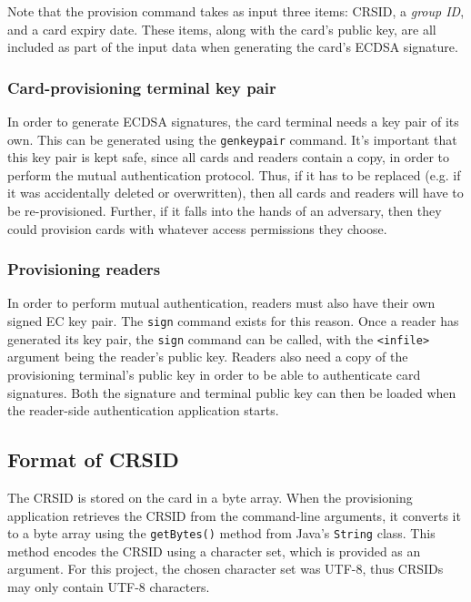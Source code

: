 \documentclass[12pt,a4paper,twoside,openright]{report}
\begin{document}
Note that the provision command takes as input three items: CRSID, a \emph{group ID}, and a card expiry date. These items, along with the card's public key, are all included as part of the input data when generating the card's ECDSA signature.

\subsubsection{Card-provisioning terminal key pair}

In order to generate ECDSA signatures, the card terminal needs a key pair of its own. This can be generated using the \texttt{genkeypair} command. It's important that this key pair is kept safe, since all cards and readers contain a copy, in order to perform the mutual authentication protocol. Thus, if it has to be replaced (e.g. if it was accidentally deleted or overwritten), then all cards and readers will have to be re-provisioned. Further, if it falls into the hands of an adversary, then they could provision cards with whatever access permissions they choose.

\subsubsection{Provisioning readers}

In order to perform mutual authentication, readers must also have their own signed EC key pair. The \texttt{sign} command exists for this reason. Once a reader has generated its key pair, the \texttt{sign} command can be called, with the \texttt{<infile>} argument being the reader's public key. Readers also need a copy of the provisioning terminal's public key in order to be able to authenticate card signatures. Both the signature and terminal public key can then be loaded when the reader-side authentication application starts.

\subsection{Format of CRSID}

The CRSID is stored on the card in a byte array. When the provisioning application retrieves the CRSID from the command-line arguments, it converts it to a byte array using the \texttt{getBytes()} method from Java's \texttt{String} class. This method encodes the CRSID using a character set, which is provided as an argument. For this project, the chosen character set was UTF-8, thus CRSIDs may only contain UTF-8 characters.
\end{document}

